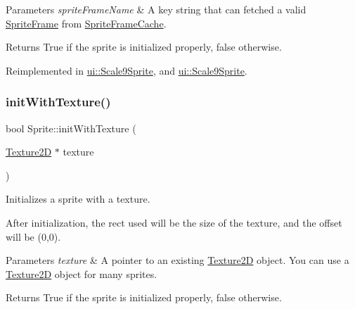 \begin{DoxyParams}{Parameters}
{\em sprite\+Frame\+Name} & A key string that can fetched a valid \hyperlink{classSpriteFrame}{Sprite\+Frame} from \hyperlink{classSpriteFrameCache}{Sprite\+Frame\+Cache}. \\
\hline
\end{DoxyParams}
\begin{DoxyReturn}{Returns}
True if the sprite is initialized properly, false otherwise. 
\end{DoxyReturn}


Reimplemented in \hyperlink{classui_1_1Scale9Sprite_ac28a73f9652a1bffc597085b06087dda}{ui\+::\+Scale9\+Sprite}, and \hyperlink{classui_1_1Scale9Sprite_ad7b24ae46593942f22091bbc76df9e41}{ui\+::\+Scale9\+Sprite}.

\mbox{\label{classSprite_a86490028d10f0a15f6090ae2b3a8ca26}} 
\subsubsection{\texorpdfstring{init\+With\+Texture()}{initWithTexture()}\hspace{0.1cm}{\footnotesize\ttfamily [1/6]}}
{\footnotesize\ttfamily bool Sprite\+::init\+With\+Texture (\begin{DoxyParamCaption}\item[{\hyperlink{classTexture2D}{Texture2D} $\ast$}]{texture }\end{DoxyParamCaption})\hspace{0.3cm}{\ttfamily [virtual]}}

Initializes a sprite with a texture.

After initialization, the rect used will be the size of the texture, and the offset will be (0,0).


\begin{DoxyParams}{Parameters}
{\em texture} & A pointer to an existing \hyperlink{classTexture2D}{Texture2D} object. You can use a \hyperlink{classTexture2D}{Texture2D} object for many sprites. \\
\hline
\end{DoxyParams}
\begin{DoxyReturn}{Returns}
True if the sprite is initialized properly, false otherwise. 
\end{DoxyReturn}
\mbox{\label{classSprite_a6757ea17c8d1d6bbb0fad0b9a1da1940}} 
